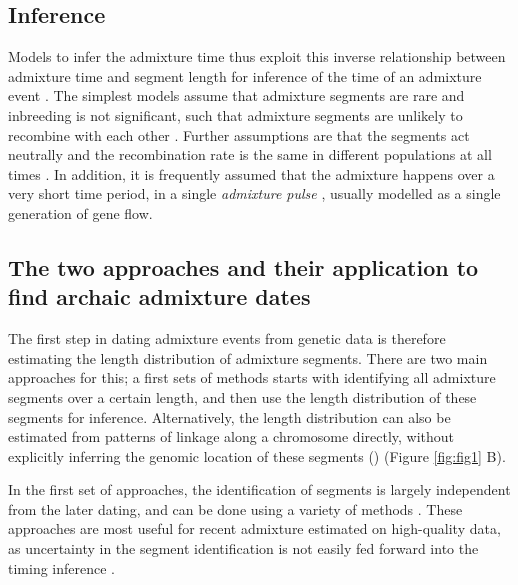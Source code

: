 \documentclass[]{article}
\begin{document}
\subsection{Inference}
Models to infer the admixture time thus exploit this inverse relationship between admixture time and segment length for inference of the time of an admixture event \citep{moorjani_history_2011,pugach_dating_2011,sankararaman_date_2012,loh_inferring_2013,sankararaman_combined_2016,pugach_gateway_2018,jacobs_multiple_2019,hellenthal_genetic_2014,pool_inference_2009,moorjani_history_2011,gravel_population_2012,liang_lengths_2014}. The simplest models assume that admixture segments are rare and inbreeding is not significant, such that admixture segments are unlikely to recombine with each other \citep{pool_inference_2009,liang_lengths_2014}. Further assumptions are that the segments act neutrally \citep{shchur_distribution_2019} and the recombination rate is the same in different populations at all times \citep{gravel_population_2012}. In addition, it is frequently assumed that the admixture happens over a very short time period, in a single \textit{admixture pulse} \citep{moorjani_history_2011}, usually modelled as a single generation of gene flow.


\subsection{The two approaches and their application to find archaic admixture dates}\label{the-two-approaches-and-their-application-to-find-archaic-admixture-dates}

The first step in dating admixture events from genetic data is therefore estimating the length distribution of admixture segments.  There are two main approaches for this; a first sets of methods starts with identifying all admixture segments over a certain length, and then use the length distribution of these segments for inference. Alternatively, the length distribution can also be estimated from patterns of linkage along a chromosome directly, without explicitly inferring the genomic location of these segments (\citep{chimusa_dating_2018}) (Figure \ref{fig:fig1} B).

 In the first set of approaches, the identification of segments is largely independent from the later dating, and can be done using a variety of methods \citep{racimo_signatures_2017,seguin_orlando_paleogenomics_2014,vernot_excavating_2016,sankararaman_combined_2016,skov_detecting_2018}. These approaches are most useful for recent admixture estimated on high-quality data, as uncertainty in the segment identification is not easily fed forward into the timing inference \citep{hellenthal_genetic_2014}.
\end{document}
